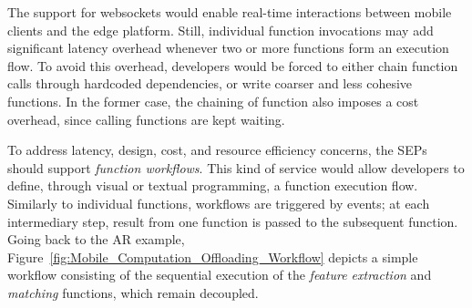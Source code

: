 
The support for websockets would enable real-time interactions between mobile clients and the edge platform. Still, individual function invocations may add significant latency overhead whenever two or more functions form an execution flow. To avoid this overhead, developers would be forced to either chain function calls through hardcoded dependencies, or write coarser and less cohesive functions. In the former case, the chaining of function also imposes a cost overhead, since calling functions are kept waiting.%

To address latency, design, cost, and resource efficiency concerns, the SEPs should support \textit{function workflows}. This kind of service would allow developers to define, through visual or textual programming, a function execution flow.
Similarly to individual functions, workflows are triggered by events; at each intermediary step, result from one function is passed to the subsequent function. Going back to the AR example, Figure~\ref{fig:Mobile_Computation_Offloading_Workflow} depicts a simple workflow consisting of the sequential execution of the \textit{feature extraction} and \textit{matching} functions, which remain decoupled.%

